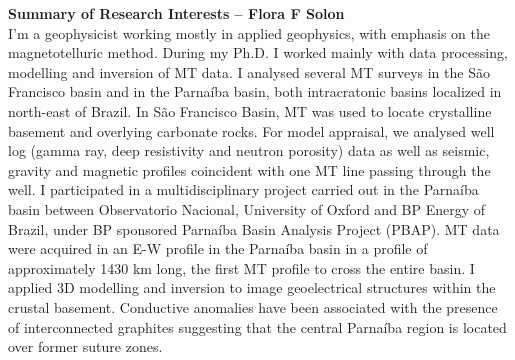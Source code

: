 \documentclass[10pt,a4paper,sans]{moderncv} %
\begin{document}









\clearpage

\textbf{Summary of Research Interests -- Flora F Solon}\\

I'm a geophysicist working mostly in applied geophysics, with emphasis on the magnetotelluric method. During my Ph.D. I worked mainly with data processing, modelling and inversion of MT data. I analysed several MT surveys in the S\~{a}o Francisco basin and in the Parna\'{i}ba basin, both intracratonic basins localized in north-east of Brazil. In S\~{a}o Francisco Basin, MT was used to locate crystalline basement and overlying carbonate rocks. For model appraisal, we analysed well log (gamma ray, deep resistivity and neutron porosity) data as well as seismic, gravity and magnetic profiles coincident with one MT line passing through the well. I participated in a multidisciplinary project carried out in the Parna\'{i}ba basin between Observatorio Nacional, University of Oxford and BP Energy of Brazil, under BP sponsored Parna\'{i}ba Basin Analysis Project (PBAP). MT data were acquired in an E-W profile in the Parna\'{i}ba basin in a profile of approximately 1430 km long, the first MT profile to cross the entire basin. I applied 3D modelling and inversion to image geoelectrical structures within the crustal basement. Conductive anomalies have been associated with the presence of interconnected graphites suggesting that the central Parna\'{i}ba region is located over former suture zones.
\end{document}

